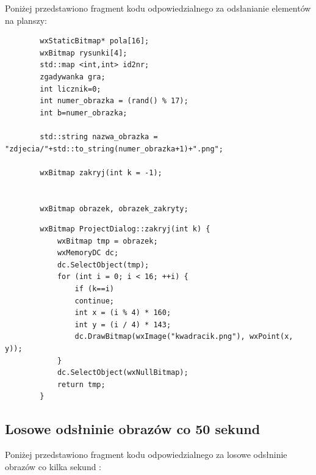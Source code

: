 \documentclass{article}
\begin{document}
	
	
	Poniżej przedstawiono fragment kodu odpowiedzialnego za odsłanianie elementów na planszy:
	\begin{lstlisting}
		wxStaticBitmap* pola[16];
		wxBitmap rysunki[4];
		std::map <int,int> id2nr;
		zgadywanka gra;
		int licznik=0;
		int numer_obrazka = (rand() % 17);
		int b=numer_obrazka;
		
		std::string nazwa_obrazka = "zdjecia/"+std::to_string(numer_obrazka+1)+".png";
		
		wxBitmap zakryj(int k = -1);
		
		
		wxBitmap obrazek, obrazek_zakryty;
	\end{lstlisting}

	\begin{lstlisting}
		wxBitmap ProjectDialog::zakryj(int k) {
			wxBitmap tmp = obrazek;
			wxMemoryDC dc;
			dc.SelectObject(tmp);
			for (int i = 0; i < 16; ++i) {
				if (k==i)
				continue;
				int x = (i % 4) * 160;
				int y = (i / 4) * 143;
				dc.DrawBitmap(wxImage("kwadracik.png"), wxPoint(x, y));
			}
			dc.SelectObject(wxNullBitmap);
			return tmp;
		}
	\end{lstlisting}
	
	\subsection{Losowe odsłninie obrazów co 50 sekund}
	
	Poniżej przedstawiono fragment kodu odpowiedzialnego za losowe odsłninie obrazów co kilka sekund :
	
\end{document}
